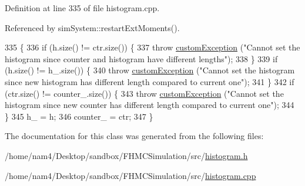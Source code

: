 Definition at line 335 of file histogram.\-cpp.



Referenced by sim\-System\-::restart\-Ext\-Moments().


\begin{DoxyCode}
335                                                                                \{
336     \textcolor{keywordflow}{if} (h.size() != ctr.size()) \{
337         \textcolor{keywordflow}{throw} \hyperlink{classcustom_exception}{customException} (\textcolor{stringliteral}{"Cannot set the histogram since counter and histogram have
       different lengths"});
338     \}
339     \textcolor{keywordflow}{if} (h.size() != h\_.size()) \{
340         \textcolor{keywordflow}{throw} \hyperlink{classcustom_exception}{customException} (\textcolor{stringliteral}{"Cannot set the histogram since new histogram has different
       length compared to current one"});
341     \}
342     \textcolor{keywordflow}{if} (ctr.size() != counter\_.size()) \{
343         \textcolor{keywordflow}{throw} \hyperlink{classcustom_exception}{customException} (\textcolor{stringliteral}{"Cannot set the histogram since new counter has different
       length compared to current one"});
344     \}
345     h\_ = h;
346     counter\_ = ctr;
347 \}
\end{DoxyCode}


The documentation for this class was generated from the following files\-:\begin{DoxyCompactItemize}
\item 
/home/nam4/\-Desktop/sandbox/\-F\-H\-M\-C\-Simulation/src/\hyperlink{histogram_8h}{histogram.\-h}\item 
/home/nam4/\-Desktop/sandbox/\-F\-H\-M\-C\-Simulation/src/\hyperlink{histogram_8cpp}{histogram.\-cpp}\end{DoxyCompactItemize}
